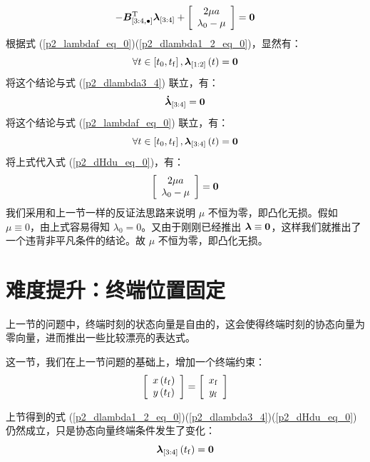 \documentclass{article}
\numberwithin{equation}{section}
\begin{document}
\begin{equation}
\label{p2_dHdu_eq_0}
- {\bm{B}}_{\left[ {3:4, \bullet } \right]}^{\rm{T}}{{\bm{\lambda }}_{\left[ {3:4} \right]}} + \left[ {\begin{array}{*{20}{c}}
{2\mu a}\\
{{\lambda _0} - \mu }
\end{array}} \right] = {\bf{0}}
\end{equation}
根据式 (\ref{p2_lambdaf_eq_0})(\ref{p2_dlambda1_2_eq_0})，显然有：
\begin{equation}
\label{p2_lambda1_2_eq_0}
\forall t \in \left[ {{t_0},{t_{\rm{f}}}} \right],{{\bm{\lambda }}_{\left[ {1:2} \right]}}\left( t \right) = {\bf{0}}
\end{equation}
将这个结论与式 (\ref{p2_dlambda3_4}) 联立，有：
\[{{{\bm{\dot \lambda }}}_{\left[ {3:4} \right]}} = {\bf{0}}\]
将这个结论与式 (\ref{p2_lambdaf_eq_0}) 联立，有：
\[\forall t \in \left[ {{t_0},{t_{\rm{f}}}} \right],{{\bm{\lambda }}_{\left[ {3:4} \right]}}\left( t \right) = {\bf{0}}\]
将上式代入式 (\ref{p2_dHdu_eq_0})，有：
\[\left[ {\begin{array}{*{20}{c}}
{2\mu a}\\
{{\lambda _0} - \mu }
\end{array}} \right] = {\bf{0}}\]
我们采用和上一节一样的反证法思路来说明 $\mu$ 不恒为零，即凸化无损。假如 $\mu \equiv 0$，由上式容易得知 $\lambda_0 = 0$。又由于刚刚已经推出 $\bm{\lambda} \equiv {\bf{0}}$，这样我们就推出了一个违背非平凡条件的结论。故 $\mu$ 不恒为零，即凸化无损。

\section{难度提升：终端位置固定}
上一节的问题中，终端时刻的状态向量是自由的，这会使得终端时刻的协态向量为零向量，进而推出一些比较漂亮的表达式。

这一节，我们在上一节问题的基础上，增加一个终端约束：
\[\left[ {\begin{array}{*{20}{c}}
{x\left( {{t_{\rm{f}}}} \right)}\\
{y\left( {{t_{\rm{f}}}} \right)}
\end{array}} \right] = \left[ {\begin{array}{*{20}{c}}
{{x_{\rm{f}}}}\\
{{y_{\rm{f}}}}
\end{array}} \right]\]

上节得到的式 (\ref{p2_dlambda1_2_eq_0})(\ref{p2_dlambda3_4})(\ref{p2_dHdu_eq_0}) 仍然成立，只是协态向量终端条件发生了变化：
\[{{\bm{\lambda }}_{\left[ {3:4} \right]}}\left( {{t_{\rm{f}}}} \right) = {\bf{0}}\]
\end{document}
